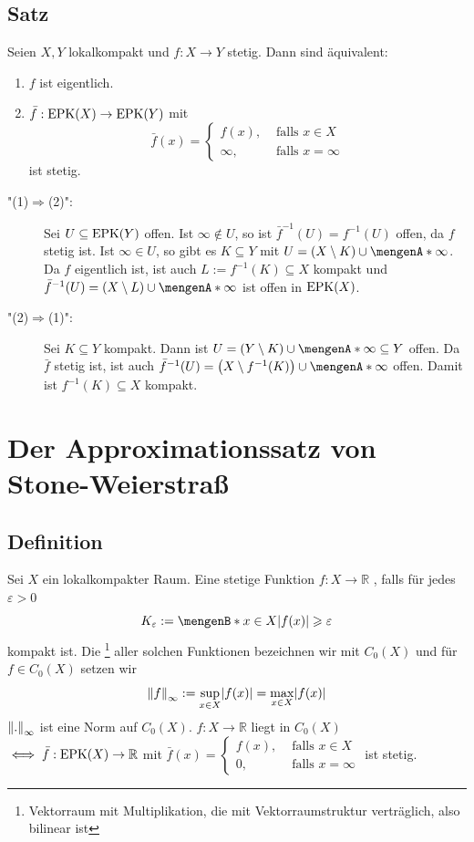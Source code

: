 \subsection[Satz: Charakterisierung von eigentlichen stetigen Abbildungen]{Satz} %
\label{sub:510}
Seien $X,Y$ lokalkompakt und $f : X \to Y$ stetig. Dann sind äquivalent:
\begin{enumerate}[(1)]
	\item $f$ ist eigentlich.
	\item $\bar{f} : \operatorname{EPK}(X) \to \operatorname{EPK}(Y) $ mit 
	\[
		\bar{f} (x) = \begin{cases}
			f(x), &\text{ falls }x \in X\\
			\infty, &\text{ falls } x = \infty
		\end{cases} 
	\]
	ist stetig.
\end{enumerate}
\begin{description}
	\item["(1)$\Rightarrow$(2)":] Sei $U \subseteq \operatorname{EPK}(Y)$ offen. Ist $\infty \not\in U$, so ist $\bar f^{-1}(U)= f ^{-1}(U)$ offen, da $f$ stetig ist. Ist 
	$\infty \in U$, so gibt es $K \subseteq Y$ mit $U = (X \setminus K) \cup \set{\infty}$. Da $f$ eigentlich ist, ist auch $L := f ^{-1}(K) \subseteq X$ kompakt und
	$\bar f ^{-1} (U) = (X \setminus L) \cup \set{\infty}$ ist offen in $\operatorname{EPK}(X)$.
	\item["(2)$\Rightarrow $(1)":] Sei $K \subseteq Y$ kompakt. Dann ist $U = (Y \setminus K) \cup \set{\infty} \subseteq Y$ offen. Da $\bar f$ stetig ist, ist auch 
	$\bar f ^{-1} (U) = \enbrace*{X \setminus f ^{-1}(K)} \cup \set{\infty}$ offen. Damit ist $f ^{-1}(K) \subseteq X$ kompakt. \bewende  
\end{description}
\newpage
\section{Der Approximationssatz von Stone-Weierstraß} %
\label{sec:6}

\subsection[Definition: Verschwinden stetiger Funktionen im Unendlichen]{Definition} %
\label{sub:61}
Sei $X$ ein lokalkompakter Raum. Eine stetige Funktion $f : X \to \mathds{R}$ , falls für jedes 
$\varepsilon >0$ 
\[
	K_\varepsilon := \set[x \in X]{\abs{f(x)} \ge \varepsilon} 
\] 
kompakt ist. Die \footnote{Vektorraum mit Multiplikation, die mit Vektorraumstruktur verträglich, also bilinear ist} aller solchen Funktionen bezeichnen wir 
mit $C_0(X)$ und für $f \in C_0 (X) $ setzen wir 
\[
	\norm[\infty]{f} :=  \sup_{x \in X} \abs*{f(x)} = \max_{x \in X} \abs*{f(x)}  
\]
$\norm[\infty]{.} $ ist eine Norm auf $C_0(X)$.
$f : X \to \mathds{R}$ liegt in $C_0(X)$ $\iff \bar{f} : \operatorname{EPK}(X) \to \mathbb{R} $ mit $\bar{f}(x) = \begin{cases}
	f(x), &\text{ falls }x \in X\\
	0 , &\text{ falls } x= \infty
\end{cases} $ ist stetig.

